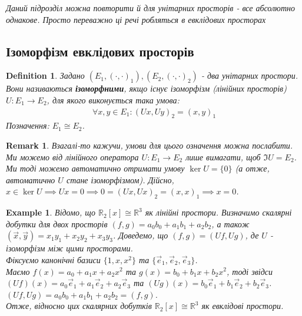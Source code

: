 \documentclass[a4paper, 10pt]{article}
\theoremstyle{theoremdd}
\newtheorem{definition}[theorem]{Definition}
\newtheorem{example}[theorem]{Example}
\newtheorem{remark}[theorem]{Remark}
\begin{document}
\noindent
\textit{Даний підрозділ можна повторити й для унітарних просторів - все абсолютно однакове. Просто переважно ці речі робляться в евклідових просторах}

\subsection{Ізоморфізм евклідових просторів}
\begin{definition}
Задано $(E_1,(\cdot,\cdot)_1), (E_2,(\cdot,\cdot)_2)$ - два унітарних простори.\\
Вони називаються \textbf{ізоморфними}, якщо існує ізоморфізм (лінійних просторів) $U \colon E_1 \to E_2$, для якого виконується така умова:
\begin{align*}
\forall x,y \in E_1: (Ux,Uy)_2 = (x,y)_1
\end{align*}
Позначення: $E_1 \cong E_2$.
\end{definition}

\begin{remark}
Взагалі-то кажучи, умови для цього означення можна послабити. Ми можемо від лінійного оператора $U \colon E_1 \to E_2$ лише вимагати, щоб $\Im U = E_2$. Ми тоді можемо автоматично отримати умову $\ker U = \{0\}$ (а отже, автоматично $U$ стане ізоморфізмом). Дійсно,\\
$x \in \ker U \implies Ux = 0 \implies 0 = (Ux,Ux)_2 = (x,x)_1 \implies x = 0$.
\end{remark}

\begin{example}
Відомо, що $\mathbb{R}_{2}[x] \cong \mathbb{R}^3$ як лінійні простори. Визначимо скалярні добутки для двох просторів $(f,g) = a_0b_0 + a_1b_1 + a_{2}b_{2}$, а також $(\vec{x},\vec{y}) = x_1y_1 + x_2y_2 + x_3y_3$. Доведемо, що $(f,g) = (Uf,Ug)$, де $U$ - ізоморфізм між цими просторами.\\
Фіксуємо канонічні базиси $\{1,x,x^2\}$ та $\{\vec{e}_1,\vec{e}_2,\vec{e}_3\}$.\\ Маємо $f(x) = a_0 + a_1 x + a_2 x^2$ та $g(x) = b_0 + b_1 x + b_2 x^2$, тоді звідси\\
$(Uf)(x) = a_0 \vec{e}_1 + a_1 \vec{e}_2 + a_2 \vec{e}_3$ та $(Ug)(x) = b_0 \vec{e}_1 + b_1 \vec{e}_2 + b_2 \vec{e}_3$.\\
$(Uf,Ug) = a_0b_0 + a_1b_1 + a_2b_2 = (f,g)$.\\
Отже, відносно цих скалярних добутків $\mathbb{R}_{2}[x] \cong \mathbb{R}^3$ як евклідові простори.
\end{example}
\end{document}

